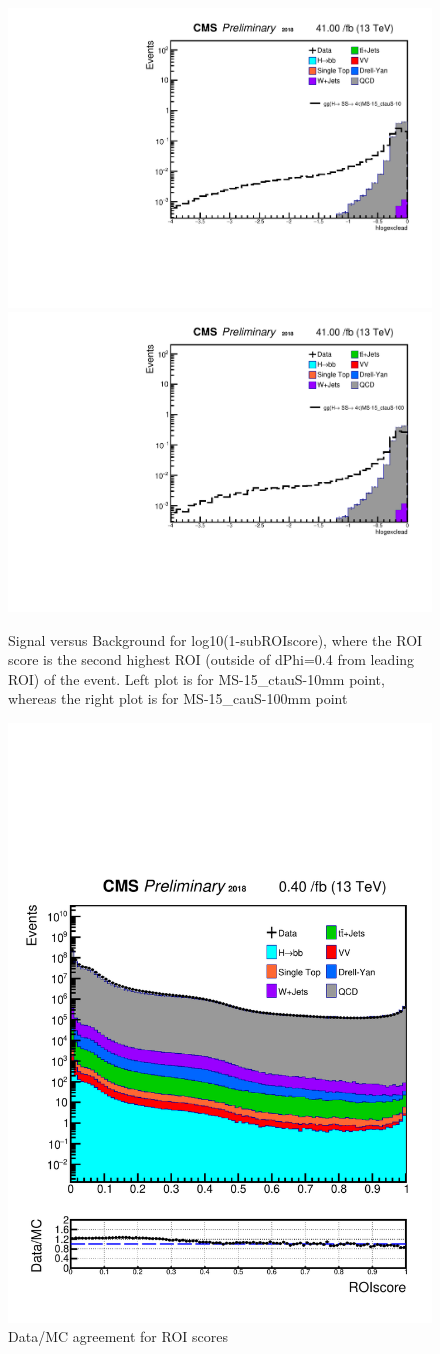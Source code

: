 \begin{figure}[h!]
   \caption{Signal versus Background for log10(1-subROIscore), where the ROI score is the second highest ROI (outside of dPhi=0.4 from leading ROI) of the event. Left plot is for MS-15\_ctauS-10mm point, whereas the right plot is for MS-15\_cauS-100mm point}
   \label{fig:excROIscore}
   \centering
   \includegraphics[width=0.47\linewidth]{figs/AnalysisNoteplot_MS-15_ctauS-10_hlogexclead.pdf}
   \includegraphics[width=0.47\linewidth]{figs/AnalysisNoteplot_MS-15_ctauS-100_hlogexclead.pdf}
 \end{figure}


\begin{figure}[h!]
  \caption{Data/MC agreement for ROI scores}
  \label{fig:DataMCscore}
  \centering
  \includegraphics[width=0.67\linewidth]{figs/Data_AnalysisNoteplot_MS-15_ctauS-10_ROIscore.pdf}

\end{figure}


